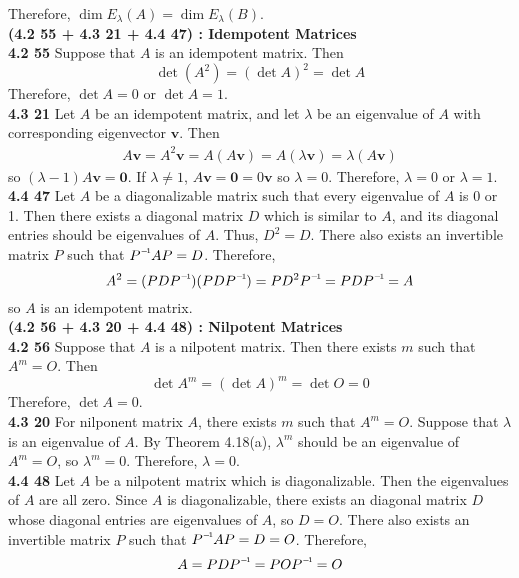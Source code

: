 Therefore, $\dim{E_{\lambda}(A)} = \dim{E_{\lambda}(B)}$. \\

\textbf{(4.2 55 + 4.3 21 + 4.4 47) : Idempotent Matrices} \\
\textbf{4.2 55} Suppose that $A$ is an idempotent matrix. Then \begin{equation*}
	\det{(A^2)} = (\det{A})^2 = \det{A}
\end{equation*} Therefore, $\det{A} = 0$ or $\det{A} = 1$. \\

\textbf{4.3 21} Let $A$ be an idempotent matrix, and let $\lambda$ be an eigenvalue of $A$ with corresponding eigenvector $\textbf{v}$. Then \begin{align*}
	A\textbf{v} = A^2\textbf{v} = A(A\textbf{v}) = A(\lambda\textbf{v}) = \lambda(A\textbf{v})
\end{align*} so $(\lambda - 1)A\textbf{v} = \textbf{0}$. If $\lambda \neq 1$, $A\textbf{v} = \textbf{0} = 0\textbf{v}$ so $\lambda = 0$. Therefore, $\lambda = 0$ or $\lambda = 1$. \\

\textbf{4.4 47} Let $A$ be a diagonalizable matrix such that every eigenvalue of $A$ is 0 or 1. Then there exists a diagonal matrix $D$ which is similar to $A$, and its diagonal entries should be eigenvalues of $A$. Thus, $D^2 = D$. There also exists an invertible matrix $P$ such that $\inv{P}AP = D$. Therefore, \begin{equation*}
	A^2 = (PD\inv{P})(PD\inv{P}) = PD^2\inv{P} = PD\inv{P} = A
\end{equation*} so $A$ is an idempotent matrix. \\

\textbf{(4.2 56 + 4.3 20 + 4.4 48) : Nilpotent Matrices} \\
\textbf{4.2 56} Suppose that $A$ is a nilpotent matrix. Then there exists $m$ such that $A^m = O$. Then \begin{equation*}
	\det{A^m} = (\det{A})^m = \det{O} = 0
\end{equation*} Therefore, $\det{A} = 0$. \\

\textbf{4.3 20} For nilponent matrix $A$, there exists $m$ such that $A^m = O$. Suppose that $\lambda$ is an eigenvalue of $A$. By Theorem 4.18(a), $\lambda^m$ should be an eigenvalue of $A^m = O$, so $\lambda^m = 0$. Therefore, $\lambda = 0$. \\

\textbf{4.4 48} Let $A$ be a nilpotent matrix which is diagonalizable. Then the eigenvalues of $A$ are all zero. Since $A$ is diagonalizable, there exists an diagonal matrix $D$ whose diagonal entries are eigenvalues of $A$, so $D = O$. There also exists an invertible matrix $P$ such that $\inv{P}AP = D = O$. Therefore, \begin{equation*}
	A = PD\inv{P} = PO\inv{P} = O
\end{equation*}
\fi